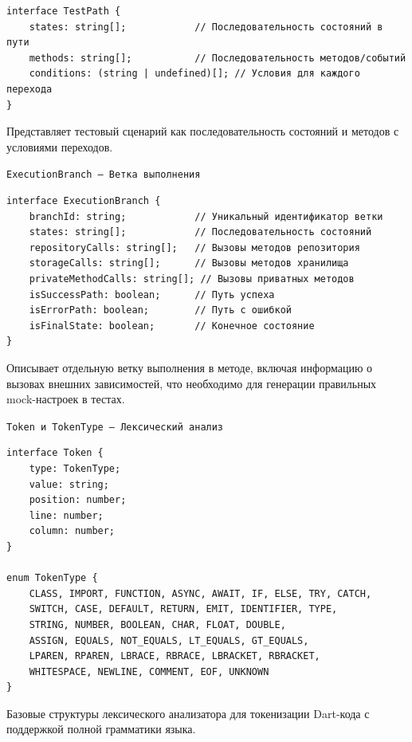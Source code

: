 \documentclass[14pt, russian]{scrartcl}
\begin{document}
\begin{verbatim}
interface TestPath {
    states: string[];            // Последовательность состояний в пути
    methods: string[];           // Последовательность методов/событий
    conditions: (string | undefined)[]; // Условия для каждого перехода
}
\end{verbatim}

Представляет тестовый сценарий как последовательность состояний и методов с условиями переходов.

\texttt{ExecutionBranch — Ветка выполнения}
\vspace{1ex}
\begin{verbatim}
interface ExecutionBranch {
    branchId: string;            // Уникальный идентификатор ветки
    states: string[];            // Последовательность состояний
    repositoryCalls: string[];   // Вызовы методов репозитория
    storageCalls: string[];      // Вызовы методов хранилища
    privateMethodCalls: string[]; // Вызовы приватных методов
    isSuccessPath: boolean;      // Путь успеха
    isErrorPath: boolean;        // Путь с ошибкой
    isFinalState: boolean;       // Конечное состояние
}
\end{verbatim}

Описывает отдельную ветку выполнения в методе, включая информацию о вызовах внешних зависимостей, что необходимо для генерации правильных mock-настроек в тестах.

\texttt{Token и TokenType — Лексический анализ}

\begin{verbatim}
interface Token {
    type: TokenType;
    value: string;
    position: number;
    line: number;
    column: number;
}

enum TokenType {
    CLASS, IMPORT, FUNCTION, ASYNC, AWAIT, IF, ELSE, TRY, CATCH,
    SWITCH, CASE, DEFAULT, RETURN, EMIT, IDENTIFIER, TYPE,
    STRING, NUMBER, BOOLEAN, CHAR, FLOAT, DOUBLE,
    ASSIGN, EQUALS, NOT_EQUALS, LT_EQUALS, GT_EQUALS,
    LPAREN, RPAREN, LBRACE, RBRACE, LBRACKET, RBRACKET,
    WHITESPACE, NEWLINE, COMMENT, EOF, UNKNOWN
}
\end{verbatim}

Базовые структуры лексического анализатора для токенизации Dart-кода с поддержкой полной грамматики языка.
\end{document}
